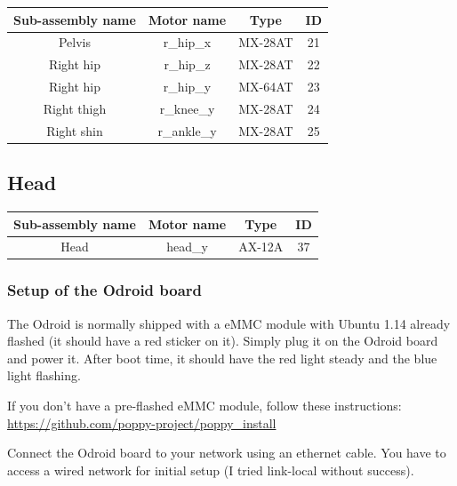 \documentclass[includefoot]{article}
\begin{document}
\begin{center}

\begin{tabular}{|c|c|c|c|}
\hline 
Sub-assembly name & Motor name & Type & ID \\ 
\hline 
Pelvis & r\_hip\_x & MX-28AT & 21 \\ 
\hline 
Right hip & r\_hip\_z & MX-28AT & 22 \\ 
\hline 
Right hip & r\_hip\_y & MX-64AT & 23 \\ 
\hline 
Right thigh & r\_knee\_y & MX-28AT & 24 \\ 
\hline 
Right shin & r\_ankle\_y & MX-28AT & 25\\
\hline 
\end{tabular} 
\end{center}


\subsection{Head} 
 \label{head-assembly}


\begin{center}

\begin{tabular}{|c|c|c|c|}
\hline 
Sub-assembly name & Motor name & Type & ID \\ 
\hline 

Head & head\_y & AX-12A & 37 \\ 
\hline 
\end{tabular} 
\end{center}

\subsubsection{Setup of the Odroid board}


The Odroid is normally shipped with a eMMC module with Ubuntu 1.14 already flashed (it should have a red sticker on it). Simply plug it on the Odroid board and power it. After boot time, it should have the red light steady and the blue light flashing.

If you don't have a pre-flashed eMMC module, follow these instructions: \url{https://github.com/poppy-project/poppy_install}

\vspace{3mm} Connect the Odroid board to your network using an ethernet cable. You have to access a wired network for initial setup (I tried link-local without success).
\end{document}
